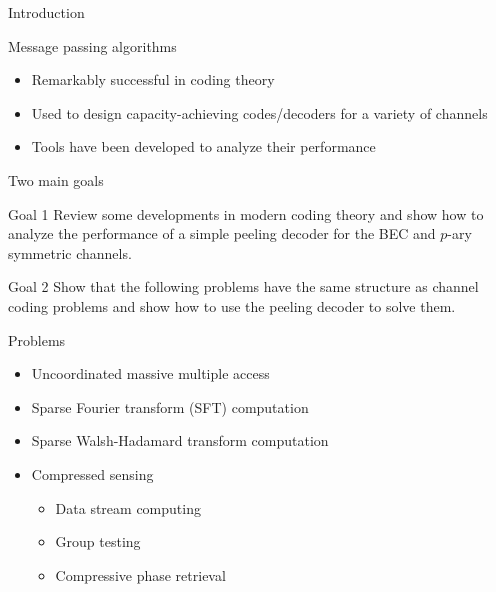 \begin{frame}{Introduction}
\begin{block}{Message passing algorithms}
\begin{itemize}
  \item Remarkably successful in coding theory
  \item Used to design capacity-achieving codes/decoders for a variety of channels
  \item Tools have been developed to analyze their performance
\end{itemize}
\end{block}

\end{frame}
\begin{frame}{Two main goals}
\begin{block}{Goal 1}
 Review some developments in modern coding theory and show how to analyze the performance of a simple peeling decoder for the BEC and $p$-ary symmetric channels.
\end{block}
\pause
\begin{block}{Goal 2}
Show that the following problems have the same structure as channel coding problems and show how to use the \alert{peeling decoder} to solve them.
\end{block}

\begin{block}{Problems}
\begin{itemize}
\item \alert{Uncoordinated massive multiple access}
\item \alert{Sparse Fourier transform (SFT) computation}
\item Sparse Walsh-Hadamard transform computation	
\item \alert{Compressed sensing}
    \begin{itemize}
    \item Data stream computing
    \item Group testing
    \item Compressive phase retrieval
    \end{itemize}
\end{itemize}
\end{block}


\end{frame}
